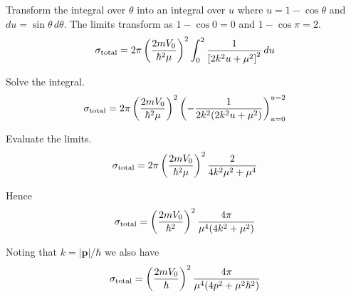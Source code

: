 Transform the integral over $\theta$ into an integral over $u$
where $u=1-\cos\theta$ and $du=\sin\theta\,d\theta$.
The limits transform as $1-\cos0=0$ and $1-\cos\pi=2$.
\begin{equation*}
\sigma_{\rm total}=2\pi\left(\frac{2mV_0}{\hbar^2\mu}\right)^2
\int_0^2\frac{1}{\left[2k^2u+\mu^2\right]^2}\,du
\end{equation*}

Solve the integral.
\begin{equation*}
\sigma_{\rm total}=2\pi\left(\frac{2mV_0}{\hbar^2\mu}\right)^2
\left(-\frac{1}{2k^2(2k^2u+\mu^2)}\right)_{u=0}^{u=2}
\end{equation*}

Evaluate the limits.
\begin{equation*}
\sigma_{\rm total}=2\pi\left(\frac{2mV_0}{\hbar^2\mu}\right)^2
\frac{2}{4k^2\mu^2+\mu^4}
\end{equation*}

Hence
\begin{equation*}
\sigma_{\rm total}=\left(\frac{2mV_0}{\hbar^2}\right)^2
\frac{4\pi}{\mu^4(4k^2+\mu^2)}
\end{equation*}

Noting that $k=|\mathbf p|/\hbar$ we also have
\begin{equation*}
\sigma_{\rm total}=\left(\frac{2mV_0}{\hbar}\right)^2
\frac{4\pi}{\mu^4(4p^2+\mu^2\hbar^2)}
\end{equation*}


